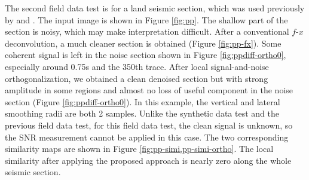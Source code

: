 The second field data test is for a land seismic section, which was used previously by \cite{fomel2007localattr} and \cite{liuyang2012}. The input image is shown in Figure \ref{fig:pp}. The shallow part of the section is noisy, which may make interpretation difficult.  After a conventional $f$-$x$ deconvolution, a much cleaner section is obtained (Figure \ref{fig:pp-fx}). Some coherent signal is left in the noise section shown in Figure \ref{fig:ppdiff-ortho0}, especially around 0.75s and the 350th trace. After local signal-and-noise orthogonalization, we obtained a clean denoised section but with strong amplitude in some regions and almost no loss of useful component in the noise section (Figure \ref{fig:ppdiff-ortho0}). In this example, the vertical and lateral smoothing radii are both 2 samples. Unlike the synthetic data test and the previous field data test, for this field data test, the clean signal is unknown, so the SNR measurement cannot be applied in this case. %
The two corresponding similarity maps are shown in Figure \ref{fig:pp-simi,pp-simi-ortho}. The local similarity after applying the proposed approach is nearly zero along the whole seismic section.






